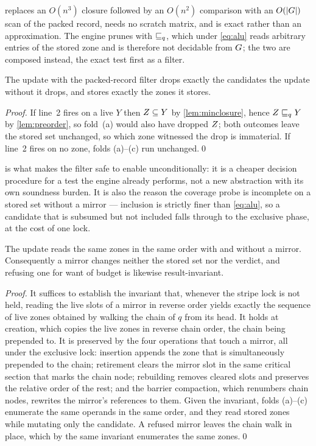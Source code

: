  replaces an $O(n^3)$ closure followed by an $O(n^2)$
comparison with an $O(|G|)$ scan of the packed record, needs no scratch matrix,
and is exact rather than an approximation.  The engine prunes with $\sqsubseteq_q$,
which under \cref{eq:alu} reads arbitrary entries of the stored zone and is
therefore not decidable from $G$; the two are composed instead, the exact test
first as a filter.

\begin{theorem}\label{thm:samestates}
The update with the packed-record filter drops exactly the candidates the
update without it drops, and stores exactly the zones it stores.
\end{theorem}
\begin{proof}
If line~2 fires on a live $Y$ then $Z \subseteq Y$ by
\cref{lem:minclosure}, hence $Z \sqsubseteq_q Y$ by \cref{lem:preorder}, so
fold~(a) would also have dropped $Z$; both outcomes leave the stored set
unchanged, so which zone witnessed the drop is immaterial.  If line~2 fires on
no zone, folds (a)--(c) run unchanged.\qed
\end{proof}

 is what makes the filter safe to enable unconditionally: it
is a cheaper decision procedure for a test the engine already performs, not a new
abstraction with its own soundness burden.  It is also the reason the coverage
probe is incomplete on a stored set without a mirror --- inclusion is strictly
finer than \cref{eq:alu}, so a candidate that is subsumed but not included falls
through to the exclusive phase, at the cost of one lock.

\begin{proposition}\label{prop:mirror}
The update reads the same zones in the same order with and without a mirror.
Consequently a mirror changes neither the stored set nor the verdict, and
refusing one for want of budget is likewise result-invariant.
\end{proposition}
\begin{proof}
It suffices to establish the invariant that, whenever the stripe lock is not
held, reading the live slots of a mirror in reverse order yields exactly the
sequence of live zones obtained by walking the chain of $q$ from its head.  It
holds at creation, which copies the live zones in reverse chain order, the chain
being prepended to.  It is preserved by the four operations that touch a mirror,
all under the exclusive lock: insertion appends the zone that is simultaneously
prepended to the chain; retirement clears the mirror slot in the same critical
section that marks the chain node; rebuilding removes cleared slots and preserves
the relative order of the rest; and the barrier compaction, which renumbers chain
nodes, rewrites the mirror's references to them.  Given the invariant, folds
(a)--(c) enumerate the same operands in the same order, and they read stored
zones while mutating only the candidate.  A refused mirror leaves the chain walk
in place, which by the same invariant enumerates the same zones.\qed
\end{proof}

